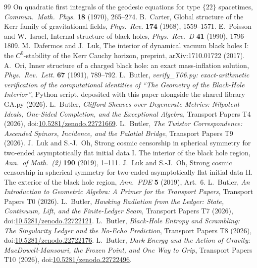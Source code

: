 \documentclass[11pt]{article}
\theoremstyle{definition}
\theoremstyle{plain}
\begin{document}
\begin{thebibliography}{99}
On quadratic first integrals of the geodesic equations for type $\{22\}$ spacetimes,
\emph{Commun.\ Math.\ Phys.} \textbf{18} (1970), 265--274.
 B.~Carter,
Global structure of the Kerr family of gravitational fields,
\emph{Phys.\ Rev.} \textbf{174} (1968), 1559--1571.
 E.~Poisson and W.~Israel,
Internal structure of black holes,
\emph{Phys.\ Rev.\ D} \textbf{41} (1990), 1796--1809.
 M.~Dafermos and J.~Luk,
The interior of dynamical vacuum black holes I: the $C^0$-stability of the Kerr Cauchy horizon,
preprint, arXiv:1710.01722 (2017).
 A.~Ori,
Inner structure of a charged black hole: an exact mass-inflation solution,
\emph{Phys.\ Rev.\ Lett.} \textbf{67} (1991), 789--792.
 L.~Butler,
\emph{verify\_T06.py: exact-arithmetic verification of the computational identities of ``The Geometry of the Black-Hole Interior''},
Python script, deposited with this paper alongside the shared library GA.py (2026).
 L.~Butler,
\emph{Clifford Sheaves over Degenerate Metrics: Nilpotent Ideals, One-Sided Completion, and the Exceptional Algebra},
Transport Papers T4 (2026), doi:\href{https://doi.org/10.5281/zenodo.22721669}{10.5281/zenodo.22721669}.
 L.~Butler,
\emph{The Twistor Correspondence: Ascended Spinors, Incidence, and the Palatial Bridge},
Transport Papers T9 (2026).
 J.~Luk and S.-J.~Oh,
Strong cosmic censorship in spherical symmetry for two-ended asymptotically flat initial data I. The interior of the black hole region,
\emph{Ann.\ of Math.\ (2)} \textbf{190} (2019), 1--111.
 J.~Luk and S.-J.~Oh,
Strong cosmic censorship in spherical symmetry for two-ended asymptotically flat initial data II. The exterior of the black hole region,
\emph{Ann.\ PDE} \textbf{5} (2019), Art.\ 6.
 L.~Butler,
\emph{An Introduction to Geometric Algebra: A Primer for the Transport Papers},
Transport Papers T0 (2026).
 L.~Butler,
\emph{Hawking Radiation from the Ledger: State, Continuum, Lift, and the Finite-Ledger Seam},
Transport Papers T7 (2026), doi:\href{https://doi.org/10.5281/zenodo.22722121}{10.5281/zenodo.22722121}.
 L.~Butler,
\emph{Black-Hole Entropy and Scrambling: The Singularity Ledger and the No-Echo Prediction},
Transport Papers T8 (2026), doi:\href{https://doi.org/10.5281/zenodo.22722176}{10.5281/zenodo.22722176}.
 L.~Butler,
\emph{Dark Energy and the Action of Gravity: MacDowell-Mansouri, the Frozen Point, and One Way to Grip},
Transport Papers T10 (2026), doi:\href{https://doi.org/10.5281/zenodo.22722496}{10.5281/zenodo.22722496}.
\end{thebibliography}
\end{document}
